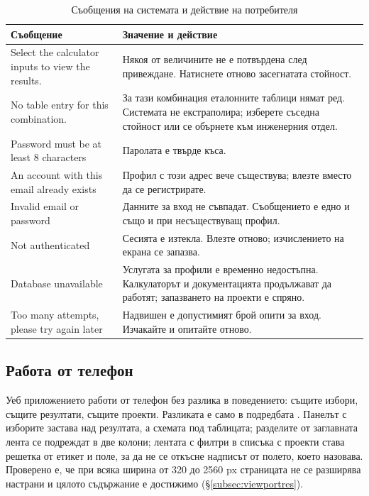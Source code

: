 \begin{table}[htbp]
\centering
\caption{Съобщения на системата и действие на потребителя}
\label{tab:ug-messages}
{\fontsize{10}{12}\selectfont
\begin{tabular}{@{}L{5.0cm}L{7.8cm}@{}}
\toprule
\textbf{Съобщение} & \textbf{Значение и действие} \\
\midrule
Select the calculator inputs to view the results. & Някоя от величините не е потвърдена след привеждане. Натиснете отново засегнатата стойност. \\
No table entry for this combination. & За тази комбинация еталонните таблици нямат ред. Системата не екстраполира; изберете съседна стойност или се обърнете към инженерния отдел. \\
Password must be at least 8 characters & Паролата е твърде къса. \\
An account with this email already exists & Профил с този адрес вече съществува; влезте вместо да се регистрирате. \\
Invalid email or password & Данните за вход не съвпадат. Съобщението е едно и също и при несъществуващ профил. \\
Not authenticated & Сесията е изтекла. Влезте отново; изчислението на екрана се запазва. \\
Database unavailable & Услугата за профили е временно недостъпна. Калкулаторът и документацията продължават да работят; запазването на проекти е спряно. \\
Too many attempts, please try again later & Надвишен е допустимият брой опити за вход. Изчакайте и опитайте отново. \\
\bottomrule
\end{tabular}}
\end{table}

\subsection{Работа от телефон}
\label{subsec:ug-mobile}

Уеб приложението работи от телефон без разлика в поведението: същите избори, същите
резултати, същите проекти. Разликата е само в подредбата .
Панелът с изборите застава над резултата, а схемата под таблицата; разделите от
заглавната лента се подреждат в две колони; лентата с филтри в списъка с проекти става
решетка от етикет и поле, за да не се откъсне надписът от полето, което назовава.
Проверено е, че при всяка ширина от 320 до 2560 px страницата не се разширява настрани
и цялото съдържание е достижимо (§\ref{subsec:viewportres}).

